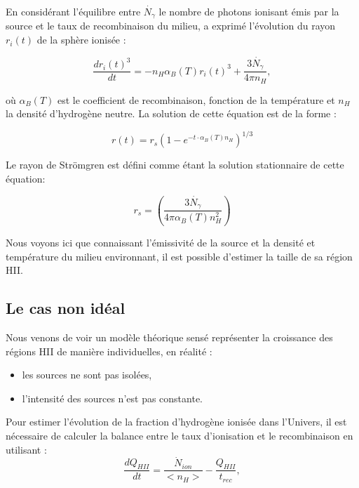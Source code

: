 En considérant l'équilibre entre $\dot{N_\gamma}$ le nombre de photons ionisant émis par la source et le taux de recombinaison du milieu, \cite{stromgren_physical_1939} a exprimé l'évolution du rayon  $r_i(t)$ de la sphère ionisée :

\begin{equation}
\frac{dr_i(t)^3}{dt} = -n_H \alpha_B(T)r_i (t)^3 + \frac{3 \dot{N_\gamma} }{4 \pi n_H},
\end{equation}

où $\alpha_B(T)$ est le coefficient de recombinaison, fonction de la température et $n_H$ la densité d'hydrogène neutre.
La solution de cette équation est de la forme :

\begin{equation}
r(t) = r_s \left( 1 - e^{-t\cdot \alpha_B(T) n_H } \right)^{1/3}
\end{equation}

%

Le rayon de Strömgren est défini comme étant la solution stationnaire de cette équation:

\begin{equation}
r_s = \left( \frac{3 \dot{N_\gamma} }{4 \pi \alpha_B(T) n_H^2} \right)
\end{equation}

Nous voyons ici que connaissant l'émissivité de la source et la densité et température du milieu environnant, il est possible d'estimer la taille de sa région HII.

\subsection{Le cas non idéal}
Nous venons de voir un modèle théorique sensé représenter la croissance des régions HII de manière individuelles, en réalité : 
\begin{itemize}
\item les sources ne sont pas isolées,
\item l'intensité des sources n'est pas constante. %
\end{itemize}

Pour estimer l'évolution de la fraction d'hydrogène ionisée dans l'Univers, il est nécessaire de calculer la balance entre le taux d'ionisation et le recombinaison \citep{0004-637X-514-2-648, RevModPhys.81.1405} en utilisant :
\begin{equation}
\frac{dQ_{HII}}{dt} = \frac{\dot{N}_{ion}}{ <n_H>} - \frac{Q_{HII}}{t_{rec}},
\end{equation}

